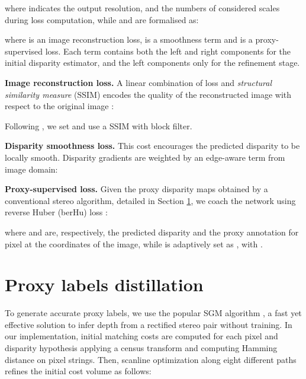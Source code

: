 \documentclass[10pt,twocolumn,letterpaper]{article}
\begin{document}
where  indicates the output resolution,  and  the numbers of considered scales during loss computation, while  and  are formalised as:




 
where  is an image reconstruction loss,  is a smoothness term and  is a proxy-supervised loss. Each term contains both the left and right components for the initial disparity estimator, and the left components only for the refinement stage.

\smallskip
\textbf{Image reconstruction loss.}
A linear combination of  loss and \textit{structural similarity measure} (SSIM) \cite{SSIM} encodes the quality of the reconstructed image  with respect to the original image :

 
Following \cite{monodepth17}, we set   and use a SSIM with  block filter.


\smallskip
\textbf{Disparity smoothness loss.}
This cost encourages the predicted disparity to be locally smooth. Disparity gradients are weighted by an edge-aware term from image domain:

 
\smallskip

\textbf{Proxy-supervised loss.}
Given the proxy disparity maps obtained by a conventional stereo algorithm, detailed in Section \ref{sec:distillation}, we coach the network using reverse Huber (berHu) loss \cite{owen2007robust}: 



 
where  and  are, respectively, the predicted disparity and the proxy annotation for pixel at the coordinates  of the image, while  is adaptively set as , with .




\smallskip
\section{Proxy labels distillation}\label{sec:distillation}

To generate accurate proxy labels, we use the popular SGM algorithm \cite{hirschmuller2005accurate}, a fast yet effective solution to infer depth from a rectified stereo pair without training. 
In our implementation, initial matching costs are computed for each pixel  and disparity hypothesis  applying a  census transform and computing Hamming distance on pixel strings. Then, scanline optimization along eight different paths refines the initial cost volume as follows: 
\end{document}
